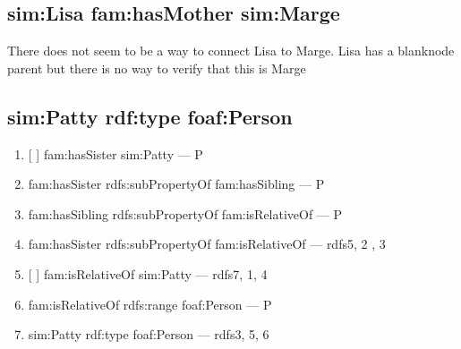 \documentclass[12pt]{paper}
\begin{document}
\subsection{sim:Lisa fam:hasMother sim:Marge}
There does not seem to be a way to connect Lisa to Marge. Lisa has a blanknode parent but there is no way to verify that this is Marge

\subsection{sim:Patty rdf:type foaf:Person}
\begin{enumerate}
\item {[ ]} fam:hasSister sim:Patty --- P
\item fam:hasSister rdfs:subPropertyOf fam:hasSibling --- P
\item fam:hasSibling rdfs:subPropertyOf fam:isRelativeOf --- P
\item fam:hasSister rdfs:subPropertyOf fam:isRelativeOf --- rdfs5, 2 , 3
\item {[ ]} fam:isRelativeOf sim:Patty --- rdfs7, 1, 4
\item fam:isRelativeOf rdfs:range foaf:Person --- P
\item sim:Patty rdf:type foaf:Person --- rdfs3, 5, 6
\end{enumerate}
\end{document}
